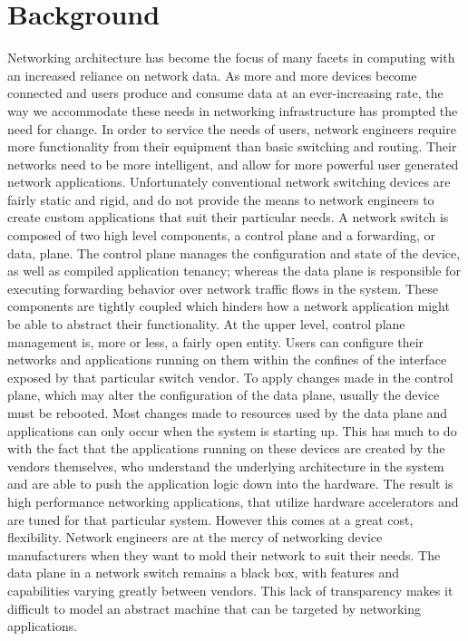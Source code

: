 \section{Background}
\label{intro:bg}
Networking architecture has become the focus of many facets in computing with
an increased reliance on network data. As more and more devices become
connected and users produce and consume data at an ever-increasing rate, the
way we accommodate these needs in networking infrastructure has prompted the
need for change. In order to service the needs of users, network engineers
require more functionality from their equipment than basic switching and
routing. Their networks need to be more intelligent, and allow for more
powerful user generated network applications. Unfortunately conventional
network switching devices are fairly static and rigid, and do not provide the
means to network engineers to create custom applications that suit their
particular needs. A network switch is composed of two high level components, a
control plane and a forwarding, or data, plane. The control plane manages the
configuration and state of the device, as well as compiled application
tenancy; whereas the data plane is responsible for executing forwarding
behavior over network traffic flows in the system. These components are
tightly coupled which hinders how a network application might be able to
abstract their functionality. At the upper level, control plane management is,
more or less, a fairly open entity. Users can configure their networks and
applications running on them within the confines of the interface exposed by
that particular switch vendor. To apply changes made in the control plane,
which may alter the configuration of the data plane, usually the device must
be rebooted. Most changes made to resources used by the data plane and
applications can only occur when the system is starting up. This has much to
do with the fact that the applications running on these devices are created by
the vendors themselves, who understand the underlying architecture in the
system and are able to push the application logic down into the hardware. The
result is high performance networking applications, that utilize hardware
accelerators and are tuned for that particular system. However this comes at a
great cost, flexibility. Network engineers are at the mercy of networking
device manufacturers when they want to mold their network to suit their needs.
The data plane in a network switch remains a black box, with features and
capabilities varying greatly between vendors. This lack of transparency makes
it difficult to model an abstract machine that can be targeted by networking
applications.


